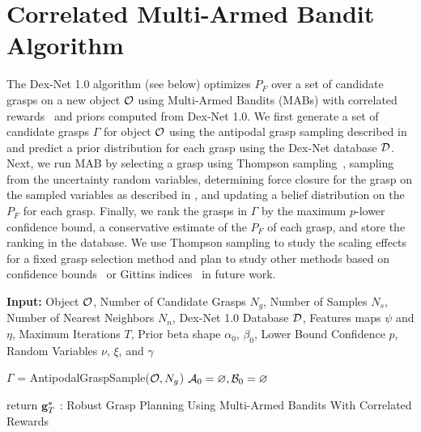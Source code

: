 \section{Correlated Multi-Armed Bandit Algorithm}
The Dex-Net 1.0 algorithm (see below) optimizes $P_F$ over a set of candidate grasps on a new object $\mathcal{O}$ using Multi-Armed Bandits (MABs) with correlated rewards~\cite{hoffman2013exploiting, pandey2007multi} and priors computed from Dex-Net 1.0.
We first generate a set of candidate grasps $\Gamma$ for object $\mathcal{O}$ using the antipodal grasp sampling described in  and predict a prior distribution for each grasp using the Dex-Net database $\mathcal{D}$.
Next, we run MAB by selecting a grasp using Thompson sampling~\cite{laskey2015bandits, oberlin2015autonomously}, sampling from the uncertainty random variables, determining force closure for the grasp on the sampled variables as described in , and updating a belief distribution on the $P_F$ for each grasp.
Finally, we rank the grasps in $\Gamma$ by the maximum $p$-lower confidence bound, a conservative estimate of the $P_F$ of each grasp, and store the ranking in the database.
We use Thompson sampling to study the scaling effects for a fixed grasp selection method and plan to study other methods based on confidence bounds~\cite{kroemer2010combining, oberlin2015autonomously} or Gittins indices~\cite{laskey2015bandits} in future work.

\begin{algorithm}
{\small
    \SetAlgoLined
    {\bf Input:} Object $\mathcal{O}$, Number of Candidate Grasps $N_g$, Number of Samples $N_s$, Number of Nearest Neighbors $N_n$, Dex-Net 1.0 Database $\mathcal{D}$, Features maps $\psi$ and $\eta$,  Maximum Iterations $T$, Prior beta shape $\alpha_0$, $\beta_0$, Lower Bound Confidence $p$, Random Variables $\nu$, $\xi$, and $\gamma$ \\
    
	$\Gamma$ = AntipodalGraspSample($\mathcal{O}, N_g$) \;
	$\mathcal{A}_0 = \varnothing, \mathcal{B}_0 = \varnothing$\;
	
	return $\mathbf{g}_T^*$\;
    : Robust Grasp Planning Using Multi-Armed Bandits With Correlated Rewards
    \label{alg:full}
}
\end{algorithm}

